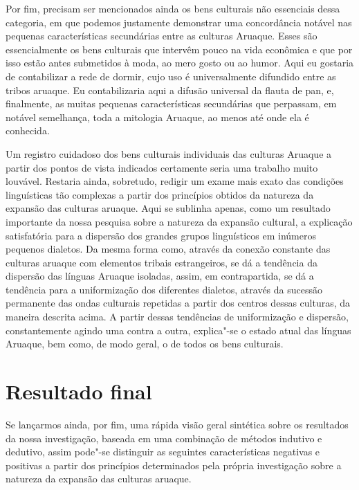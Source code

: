 Por fim, precisam ser mencionados ainda os bens culturais não essenciais
dessa categoria, em que podemos justamente demonstrar uma concordância
notável nas pequenas características secundárias entre as culturas
Aruaque. Esses são essencialmente os bens culturais que intervêm pouco
na vida econômica e que por isso estão antes submetidos à moda, ao mero
gosto ou ao humor. Aqui eu gostaria de contabilizar a rede de dormir,
cujo uso é universalmente difundido entre as tribos aruaque. Eu
contabilizaria aqui a difusão universal da flauta de pan, e, finalmente,
as muitas pequenas características secundárias que perpassam, em notável
semelhança, toda a mitologia Aruaque, ao menos até onde ela é conhecida.

Um registro cuidadoso dos bens culturais individuais das culturas
Aruaque a partir dos pontos de vista indicados certamente seria uma
trabalho muito louvável. Restaria ainda, sobretudo, redigir um exame
mais exato das condições linguísticas tão complexas a partir dos
princípios obtidos da natureza da expansão das culturas aruaque. Aqui se
sublinha apenas, como um resultado importante da nossa pesquisa sobre a
natureza da expansão cultural, a explicação satisfatória para a
dispersão dos grandes grupos linguísticos em inúmeros pequenos dialetos.
Da mesma forma como, através da conexão constante das culturas aruaque
com elementos tribais estrangeiros, se dá a tendência da dispersão das
línguas Aruaque isoladas, assim, em contrapartida, se dá a tendência
para a uniformização dos diferentes dialetos, através da sucessão
permanente das ondas culturais repetidas a partir dos centros dessas
culturas, da maneira descrita acima. A partir dessas tendências de
uniformização e dispersão, constantemente agindo uma contra a outra,
explica"-se o estado atual das línguas Aruaque, bem como, de modo geral,
o de todos os bens culturais.

\chapter{Resultado final}

Se lançarmos ainda, por fim, uma rápida visão geral sintética sobre os
resultados da nossa investigação, baseada em uma combinação de métodos
indutivo e dedutivo, assim pode"-se distinguir as seguintes
características negativas e positivas a partir dos princípios
determinados pela própria investigação sobre a natureza da expansão das
culturas aruaque.

